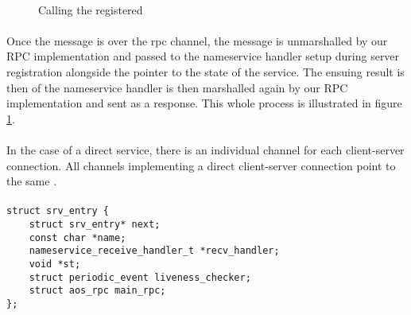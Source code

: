 \paragraph{}

\begin{figure}[h!]
    \centering
        \scalebox{0.6}{
            
        }
    \caption{Calling the registered }
    \label{fig:ns_call_ns_recv_handler_t}
\end{figure}

\paragraph{}
Once the message is over the rpc channel, the message is unmarshalled by our RPC implementation and passed to the nameservice handler setup during server registration alongside the pointer to the state of the service. The ensuing result is then of the nameservice handler is then marshalled again by our RPC implementation and sent as a response. This whole process is illustrated in figure \ref{fig:ns_call_ns_recv_handler_t}.





\paragraph{}
In the case of a direct service, there is an individual channel for each client-server connection. All channels implementing a direct client-server connection point to the same . 
\paragraph{}
\begin{code}
\begin{mdframed}[style=myframe]
\begin{verbatim}
struct srv_entry {
	struct srv_entry* next;
	const char *name;
	nameservice_receive_handler_t *recv_handler;
	void *st;
	struct periodic_event liveness_checker;
	struct aos_rpc main_rpc;
};
\end{verbatim}
\end{mdframed}

\caption{Server entry struct}
\newline
\label{code:server_entry}
\end{code}
\paragraph{}


